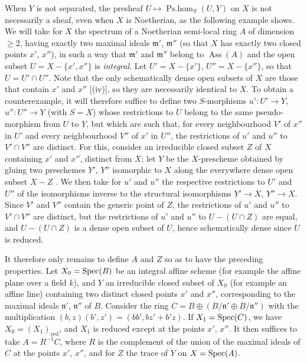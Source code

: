 \begin{remark}[20.2.16]
\label{IV.20.2.16}
When $Y$ is not separated, the presheaf $U\mapsto\operatorname{Ps.hom}_S(U,Y)$ on $X$ is not necessarily a sheaf, even when $X$ is Noetherian, as the following example shows.
We will take for $X$ the spectrum of a Noetherian semi-local ring $A$ of dimension $\geq2$, having exactly two maximal
ideals $\mathfrak{m}'$, $\mathfrak{m}''$ (so that $X$ has exactly two closed points $x'$, $x''$), in such a way that $\mathfrak{m}'$ and $\mathfrak{m}''$ belong to $\operatorname{Ass}(A)$ and the open subset $U=X-\{x',x''\}$ is \emph{integral}.
Let $U'=X-\{x'\}$, $U''=X-\{x''\}$, so that $U=U'\cap U''$.
Note that the only schematically dense open subsets of $X$ are those that contain $x'$ and $x''$ [(iv)], so they are necessarily identical to $X$.
To obtain a counterexample, it will therefore suffice to define two $S$-morphisms $u':U'\to Y$, $u'':U''\to Y$ (with $S=X$) whose restrictions to $U$ belong to the same pseudo-morphism from $U$ to $Y$, but which are such that, for every neighbourhood $V'$ of $x''$ in $U'$ and every neighbourhood $V''$ of $x'$ in $U''$, the restrictions of $u'$ and $u''$ to $V'\cap V''$ are distinct.
For this, consider an irreducible closed subset $Z$ of $X$ containing $x'$ and $x''$, distinct from $X$; let $Y$ be the $X$-prescheme obtained by gluing two preschemes $Y'$, $Y''$ isomorphic to $X$ along the everywhere dense open subset $X-Z$ .
We then take for $u'$ and $u''$ the respective restrictions to $U'$ and $U''$ of the isomorphisms inverse to the structural isomorphisms $Y'\to X$, $Y''\to X$.
Since $V'$ and $V''$ contain the generic point of $Z$, the restrictions of $u'$ and $u''$ to $V'\cap V''$ are distinct, but the restrictions of $u'$ and $u''$ to $U-(U\cap Z)$ are equal, and $U-(U\cap Z)$ is a dense open subset of $U$, hence schematically dense since $U$ is reduced.

It therefore only remains to define $A$ and $Z$ so as to have the preceding properties.
Let $X_0=\operatorname{Spec}(B)$ be an integral affine scheme (for example the affine plane over a field $k$), and $Y$ an irreducible closed subset of $X_0$ (for example an affine line) containing two distinct closed points $x'$ and $x''$, corresponding to the maximal ideals $\mathfrak{n}'$, $\mathfrak{n}''$ of $B$.
Consider the ring $C=B\oplus(B/\mathfrak{n}'\oplus B/\mathfrak{n}'')$ with the multiplication $(b,z)(b',z')=(bb',bz'+b'z)$.
If $X_1=\operatorname{Spec}(C)$, we have $X_0=(X_1)_\mathrm{red}$, and $X_1$ is reduced except at the points $x'$, $x''$.
It then suffices to take $A=R^{-1}C$, where $R$ is the complement of the union of the maximal ideals of $C$ at the points $x'$, $x''$, and for $Z$ the trace of $Y$ on $X=\operatorname{Spec}(A)$.
\end{remark}


